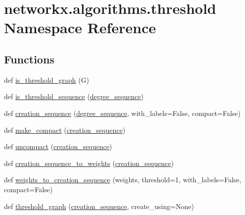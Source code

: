\hypertarget{namespacenetworkx_1_1algorithms_1_1threshold}{}\section{networkx.\+algorithms.\+threshold Namespace Reference}
\label{namespacenetworkx_1_1algorithms_1_1threshold}
\subsection*{Functions}
\begin{DoxyCompactItemize}
\item 
def \hyperlink{namespacenetworkx_1_1algorithms_1_1threshold_a473d58bddd35b77a537dcd6f8007d6d6}{is\+\_\+threshold\+\_\+graph} (G)
\item 
def \hyperlink{namespacenetworkx_1_1algorithms_1_1threshold_a3941fdbefea9aefa8625b4b642156145}{is\+\_\+threshold\+\_\+sequence} (\hyperlink{namespacenetworkx_1_1algorithms_1_1threshold_a5b49bf4f8c08b7b87b61e20477ae4b00}{degree\+\_\+sequence})
\item 
def \hyperlink{namespacenetworkx_1_1algorithms_1_1threshold_a0b9028c3c0a3a2fda4bf3b836189d3dc}{creation\+\_\+sequence} (\hyperlink{namespacenetworkx_1_1algorithms_1_1threshold_a5b49bf4f8c08b7b87b61e20477ae4b00}{degree\+\_\+sequence}, with\+\_\+labels=False, compact=False)
\item 
def \hyperlink{namespacenetworkx_1_1algorithms_1_1threshold_aa16e6d28e3f28bffb1ffcb5c81068c9d}{make\+\_\+compact} (\hyperlink{namespacenetworkx_1_1algorithms_1_1threshold_a0b9028c3c0a3a2fda4bf3b836189d3dc}{creation\+\_\+sequence})
\item 
def \hyperlink{namespacenetworkx_1_1algorithms_1_1threshold_a853782d9473275a93bcdc3c39d5ae2b4}{uncompact} (\hyperlink{namespacenetworkx_1_1algorithms_1_1threshold_a0b9028c3c0a3a2fda4bf3b836189d3dc}{creation\+\_\+sequence})
\item 
def \hyperlink{namespacenetworkx_1_1algorithms_1_1threshold_a45645774713f4a3a1d0c1cf4ef407742}{creation\+\_\+sequence\+\_\+to\+\_\+weights} (\hyperlink{namespacenetworkx_1_1algorithms_1_1threshold_a0b9028c3c0a3a2fda4bf3b836189d3dc}{creation\+\_\+sequence})
\item 
def \hyperlink{namespacenetworkx_1_1algorithms_1_1threshold_af967d42f89e8b2692a23fee2e85edb07}{weights\+\_\+to\+\_\+creation\+\_\+sequence} (weights, threshold=1, with\+\_\+labels=False, compact=False)
\item 
def \hyperlink{namespacenetworkx_1_1algorithms_1_1threshold_a3bd194f5a5c9317341cb7ef3bbe7568d}{threshold\+\_\+graph} (\hyperlink{namespacenetworkx_1_1algorithms_1_1threshold_a0b9028c3c0a3a2fda4bf3b836189d3dc}{creation\+\_\+sequence}, create\+\_\+using=None)

\end{DoxyCompactItemize}
